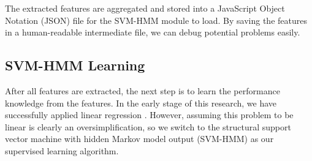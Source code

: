    The extracted features are aggregated and stored into a JavaScript Object Notation (JSON) file for the SVM-HMM module to load. By saving the features in a human-readable intermediate file, we can debug potential problems easily.%


\subsection{SVM-HMM Learning}
After all features are extracted, the next step is to learn the performance knowledge from the features. In the early stage of this research, we have successfully applied linear regression \cite{Lyu2012}. However, assuming this problem to be linear is clearly an oversimplification, so we switch to the structural support vector machine with hidden Markov model output (SVM-HMM)\cite{svm2009, svm2005, svm2003} as our supervised learning algorithm. 

